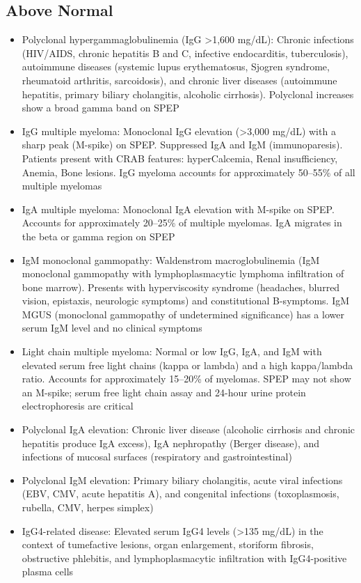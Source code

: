 \subsection*{Above Normal}
\begin{itemize}
  \item Polyclonal hypergammaglobulinemia (IgG >1,600 mg/dL): Chronic infections (HIV/AIDS, chronic hepatitis B and C, infective endocarditis, tuberculosis), autoimmune diseases (systemic lupus erythematosus, Sjogren syndrome, rheumatoid arthritis, sarcoidosis), and chronic liver diseases (autoimmune hepatitis, primary biliary cholangitis, alcoholic cirrhosis). Polyclonal increases show a broad gamma band on SPEP
  \item IgG multiple myeloma: Monoclonal IgG elevation (>3,000 mg/dL) with a sharp peak (M-spike) on SPEP. Suppressed IgA and IgM (immunoparesis). Patients present with CRAB features: hyperCalcemia, Renal insufficiency, Anemia, Bone lesions. IgG myeloma accounts for approximately 50--55\% of all multiple myelomas
  \item IgA multiple myeloma: Monoclonal IgA elevation with M-spike on SPEP. Accounts for approximately 20--25\% of multiple myelomas. IgA migrates in the beta or gamma region on SPEP
  \item IgM monoclonal gammopathy: Waldenstrom macroglobulinemia (IgM monoclonal gammopathy with lymphoplasmacytic lymphoma infiltration of bone marrow). Presents with hyperviscosity syndrome (headaches, blurred vision, epistaxis, neurologic symptoms) and constitutional B-symptoms. IgM MGUS (monoclonal gammopathy of undetermined significance) has a lower serum IgM level and no clinical symptoms
  \item Light chain multiple myeloma: Normal or low IgG, IgA, and IgM with elevated serum free light chains (kappa or lambda) and a high kappa/lambda ratio. Accounts for approximately 15--20\% of myelomas. SPEP may not show an M-spike; serum free light chain assay and 24-hour urine protein electrophoresis are critical
  \item Polyclonal IgA elevation: Chronic liver disease (alcoholic cirrhosis and chronic hepatitis produce IgA excess), IgA nephropathy (Berger disease), and infections of mucosal surfaces (respiratory and gastrointestinal)
  \item Polyclonal IgM elevation: Primary biliary cholangitis, acute viral infections (EBV, CMV, acute hepatitis A), and congenital infections (toxoplasmosis, rubella, CMV, herpes simplex)
  \item IgG4-related disease: Elevated serum IgG4 levels (>135 mg/dL) in the context of tumefactive lesions, organ enlargement, storiform fibrosis, obstructive phlebitis, and lymphoplasmacytic infiltration with IgG4-positive plasma cells
\end{itemize}

